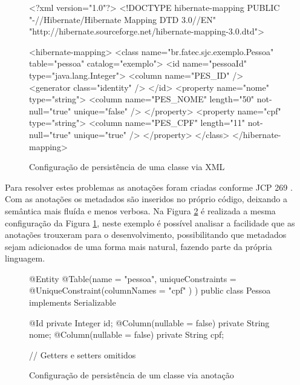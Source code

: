 \begin{figure}[H]
    \centering
    \caption{Configuração de persistência de uma classe via XML}
    \begin{xml}
<?xml version="1.0"?>
<!DOCTYPE hibernate-mapping PUBLIC "-//Hibernate/Hibernate Mapping DTD 3.0//EN"
"http://hibernate.sourceforge.net/hibernate-mapping-3.0.dtd">

<hibernate-mapping>
    <class name="br.fatec.sjc.exemplo.Pessoa" table="pessoa" catalog="exemplo">
        <id name="pessoaId" type="java.lang.Integer">
            <column name="PES_ID" />
            <generator class="identity" />
        </id>
        <property name="nome" type="string">
            <column name="PES_NOME" length="50" not-null="true" unique="false" />
        </property>
        <property name="cpf" type="string">
            <column name="PES_CPF" length="11" not-null="true" unique="true" />
        </property>
    </class>
</hibernate-mapping>
    \end{xml}
    \label{fig:arquivo-metadado}
\end{figure}

\par Para resolver estes problemas as anotações foram criadas conforme JCP 269 . Com as anotações os metadados são inseridos no próprio código, deixando a semântica mais fluída e menos verbosa. Na Figura \ref{fig:classe-metadado} é realizada a mesma configuração da Figura \ref{fig:arquivo-metadado}, neste exemplo é possível analisar a facilidade que as anotações trouxeram para o desenvolvimento, possibilitando que metadados sejam adicionados de uma forma mais natural, fazendo parte da própria linguagem.

\begin{figure}[H]
    \centering
    \caption{Configuração de persistência de um classe via anotação}
    \begin{java}
@Entity
@Table(name = "pessoa", uniqueConstraints = { @UniqueConstraint(columnNames = { "cpf" }) 
})
public class Pessoa implements Serializable {

	@Id
	private Integer id;
	@Column(nullable = false)
	private String nome;
	@Column(nullable = false)
	private String cpf;

    // Getters e setters omitidos

}
    \end{java}
    \label{fig:classe-metadado}
\end{figure}

